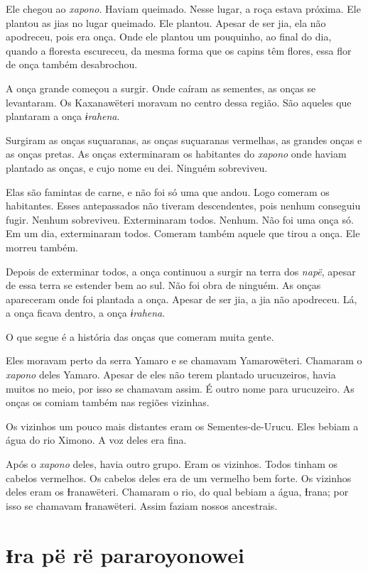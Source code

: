 Ele chegou ao \textit{xapono}. Haviam queimado. Nesse lugar, a roça estava
próxima. Ele plantou as jias no lugar queimado. Ele plantou. Apesar de
ser jia, ela não apodreceu, pois era onça. Onde ele plantou um pouquinho,
ao final do dia, quando a floresta escureceu, da mesma forma que os
capins têm flores, essa flor de onça também desabrochou. 

A onça grande começou a surgir. Onde caíram as sementes, as onças se
levantaram. Os Kaxanawëteri moravam no centro dessa região. São aqueles
que plantaram a onça \textit{ɨrahena}. 

Surgiram as onças suçuaranas, as onças suçuaranas vermelhas, as grandes
onças e as onças pretas. As onças exterminaram os habitantes do \textit{xapono}
onde haviam plantado as onças, e cujo nome eu dei. Ninguém sobreviveu. 

Elas são famintas de carne, e não foi só uma que andou. Logo comeram os
habitantes. Esses antepassados não tiveram descendentes, pois nenhum
conseguiu fugir. Nenhum sobreviveu. Exterminaram todos. Nenhum. Não foi uma onça só. Em um dia, exterminaram todos. Comeram também aquele que tirou
a onça. Ele morreu também. 

Depois de exterminar todos, a onça continuou a surgir na terra
dos \textit{napë}, apesar de essa terra se estender bem ao sul. Não foi obra
de ninguém. As onças apareceram onde foi plantada a onça. Apesar de ser
jia, a jia não apodreceu. Lá, a onça ficava dentro, a
onça \textit{ɨrahena}. 

O que segue é a história das onças que comeram muita gente. 

Eles moravam perto da serra Yamaro e se chamavam Yamarowëteri. Chamaram
o \textit{xapono} deles Yamaro. Apesar de eles não terem plantado urucuzeiros,
havia muitos no meio, por isso se chamavam assim. É outro nome para
urucuzeiro. As onças os comiam também nas regiões vizinhas. 

Os vizinhos um pouco mais distantes eram os Sementes-de-Urucu. Eles
bebiam a água do rio Ximono. A voz deles era fina. 

Após o \textit{xapono} deles, havia outro grupo. Eram os vizinhos. Todos tinham
os cabelos vermelhos. Os cabelos deles era de um vermelho bem forte. Os
vizinhos deles eram os Ɨranawëteri. Chamaram o rio, do qual bebiam a
água, Ɨrana; por isso se chamavam Ɨranawëteri. Assim faziam nossos
ancestrais.

\chapter{Ɨra pë rë pararoyonowei}
 
